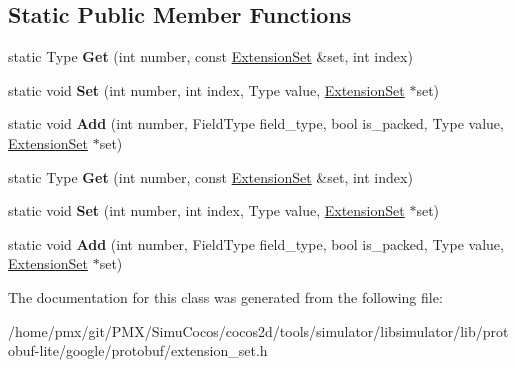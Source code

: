 \subsection*{Static Public Member Functions}
\begin{DoxyCompactItemize}
\item 
\mbox{\label{classgoogle_1_1protobuf_1_1internal_1_1RepeatedPrimitiveTypeTraits_a8a66131f33299fd361164170407c37cb}} 
static Type {\bfseries Get} (int number, const \hyperlink{classgoogle_1_1protobuf_1_1internal_1_1ExtensionSet}{Extension\+Set} \&set, int index)
\item 
\mbox{\label{classgoogle_1_1protobuf_1_1internal_1_1RepeatedPrimitiveTypeTraits_a439a75dbcbb34bf361a6eae14f869d5e}} 
static void {\bfseries Set} (int number, int index, Type value, \hyperlink{classgoogle_1_1protobuf_1_1internal_1_1ExtensionSet}{Extension\+Set} $\ast$set)
\item 
\mbox{\label{classgoogle_1_1protobuf_1_1internal_1_1RepeatedPrimitiveTypeTraits_aea96f7ddd2331b7a1b6662c1dcb5a384}} 
static void {\bfseries Add} (int number, Field\+Type field\+\_\+type, bool is\+\_\+packed, Type value, \hyperlink{classgoogle_1_1protobuf_1_1internal_1_1ExtensionSet}{Extension\+Set} $\ast$set)
\item 
\mbox{\label{classgoogle_1_1protobuf_1_1internal_1_1RepeatedPrimitiveTypeTraits_a8a66131f33299fd361164170407c37cb}} 
static Type {\bfseries Get} (int number, const \hyperlink{classgoogle_1_1protobuf_1_1internal_1_1ExtensionSet}{Extension\+Set} \&set, int index)
\item 
\mbox{\label{classgoogle_1_1protobuf_1_1internal_1_1RepeatedPrimitiveTypeTraits_a439a75dbcbb34bf361a6eae14f869d5e}} 
static void {\bfseries Set} (int number, int index, Type value, \hyperlink{classgoogle_1_1protobuf_1_1internal_1_1ExtensionSet}{Extension\+Set} $\ast$set)
\item 
\mbox{\label{classgoogle_1_1protobuf_1_1internal_1_1RepeatedPrimitiveTypeTraits_aea96f7ddd2331b7a1b6662c1dcb5a384}} 
static void {\bfseries Add} (int number, Field\+Type field\+\_\+type, bool is\+\_\+packed, Type value, \hyperlink{classgoogle_1_1protobuf_1_1internal_1_1ExtensionSet}{Extension\+Set} $\ast$set)
\end{DoxyCompactItemize}


The documentation for this class was generated from the following file\+:\begin{DoxyCompactItemize}
\item 
/home/pmx/git/\+P\+M\+X/\+Simu\+Cocos/cocos2d/tools/simulator/libsimulator/lib/protobuf-\/lite/google/protobuf/extension\+\_\+set.\+h\end{DoxyCompactItemize}

